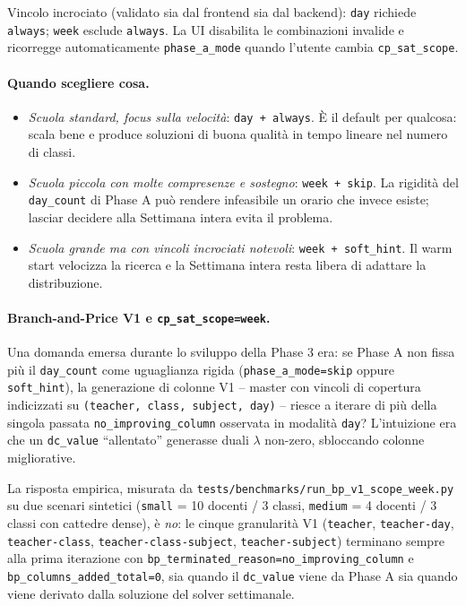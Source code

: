 Vincolo incrociato (validato sia dal frontend sia dal backend):
\texttt{day} richiede \texttt{always}; \texttt{week} esclude
\texttt{always}. La UI disabilita le combinazioni invalide e ricorregge
automaticamente \texttt{phase\_a\_mode} quando l'utente cambia
\texttt{cp\_sat\_scope}.

\paragraph{Quando scegliere cosa.}
\begin{itemize}
  \item \emph{Scuola standard, focus sulla velocit\`a}: \texttt{day
        + always}. \`E il default per qualcosa: scala bene e produce
        soluzioni di buona qualit\`a in tempo lineare nel numero di
        classi.
  \item \emph{Scuola piccola con molte compresenze e sostegno}:
        \texttt{week + skip}. La rigidit\`a del \texttt{day\_count}
        di Phase A pu\`o rendere infeasibile un orario che invece
        esiste; lasciar decidere alla Settimana intera evita il
        problema.
  \item \emph{Scuola grande ma con vincoli incrociati notevoli}:
        \texttt{week + soft\_hint}. Il warm start velocizza la
        ricerca e la Settimana intera resta libera di adattare la
        distribuzione.
\end{itemize}

\paragraph{Branch-and-Price V1 e \texttt{cp\_sat\_scope=week}.}
Una domanda emersa durante lo sviluppo della Phase 3 era: se
Phase A non fissa pi\`u il \texttt{day\_count} come uguaglianza
rigida (\texttt{phase\_a\_mode=skip} oppure \texttt{soft\_hint}),
la generazione di colonne V1 -- master con vincoli di copertura
indicizzati su \texttt{(teacher, class, subject, day)} -- riesce a
iterare di pi\`u della singola passata
\texttt{no\_improving\_column} osservata in modalit\`a
\texttt{day}? L'intuizione era che un \texttt{dc\_value} ``allentato''
generasse duali $\lambda$ non-zero, sbloccando colonne migliorative.

La risposta empirica, misurata da
\texttt{tests/benchmarks/run\_bp\_v1\_scope\_week.py} su due scenari
sintetici (\texttt{small} = 10 docenti / 3 classi, \texttt{medium}
= 4 docenti / 3 classi con cattedre dense), \`e \emph{no}: le
cinque granularit\`a V1 (\texttt{teacher}, \texttt{teacher-day},
\texttt{teacher-class}, \texttt{teacher-class-subject},
\texttt{teacher-subject}) terminano sempre alla prima iterazione
con \texttt{bp\_terminated\_reason=no\_improving\_column} e
\texttt{bp\_columns\_added\_total=0}, sia quando il
\texttt{dc\_value} viene da Phase A sia quando viene derivato dalla
soluzione del solver settimanale.

